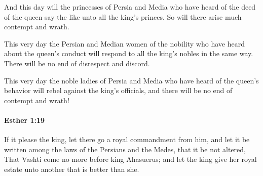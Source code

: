 			\begin{versebox}
					\item[BHS] 
					\item[LXX] 
					\item[ASV] And this day will the princesses of Persia and Media who have heard of the deed of the queen say the like unto all the king's princes. So will there arise much contempt and wrath.
					\item[NIV] This very day the Persian and Median women of the nobility who have heard about the queen’s conduct will respond to all the king’s nobles in the same way. There will be no end of disrespect and discord.
					\item[NRSV] This very day the noble ladies of Persia and Media who have heard of the queen’s behavior will rebel against the king’s officials, and there will be no end of contempt and wrath!
			\end{versebox}

		\paragraph{Esther 1:19} %
			\label{ESTHER-1-19}

			If it please the king, let there go a royal commandment from him, and let it be written among the laws of the Persians and the Medes, that it be not altered, That Vashti come no more before king Ahasuerus; and let the king give her royal estate unto another that is better than she.

